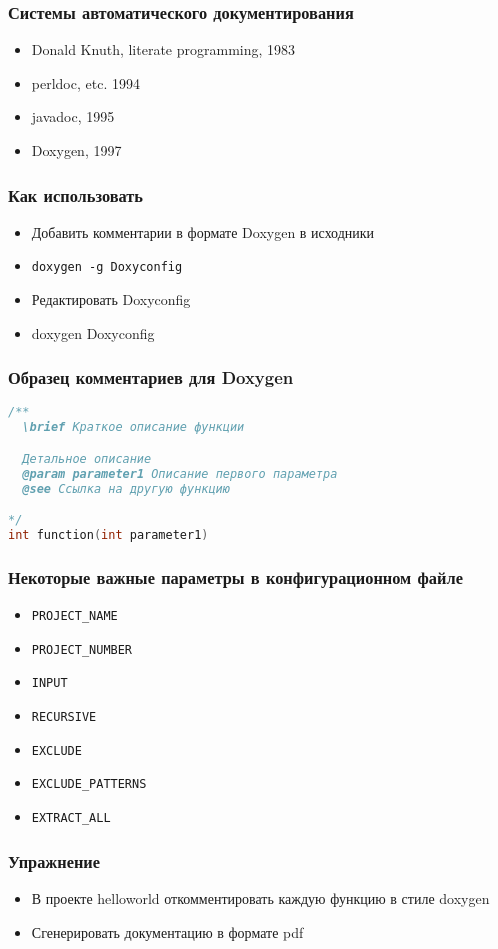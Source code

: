 \begin{frame}
 \frametitle{Системы автоматического документирования}
 \begin{itemize}
  \item Donald Knuth, literate programming, 1983
  \item perldoc, etc. 1994
  \item javadoc, 1995
  \item Doxygen, 1997
 \end{itemize}
\end{frame}

\begin{frame}
 \frametitle{Как использовать}
 \begin{itemize}
  \item Добавить комментарии в формате Doxygen в исходники
  \item \texttt{doxygen -g Doxyconfig}
  \item Редактировать Doxyconfig
  \item doxygen Doxyconfig
 \end{itemize}
\end{frame}

\begin{frame}[fragile]
 \frametitle{Образец комментариев для Doxygen}
\begin{lstlisting}[language=C]
/**
  \brief Краткое описание функции

  Детальное описание
  @param parameter1 Описание первого параметра
  @see Ссылка на другую функцию

*/
int function(int parameter1) 
\end{lstlisting}
\end{frame}

\begin{frame}[fragile]
 \frametitle{Некоторые важные параметры в конфигурационном файле}
 \begin{itemize}
  \item \verb+PROJECT_NAME+
  \item \verb+PROJECT_NUMBER+
  \item \verb+INPUT+  
  \item \verb+RECURSIVE+
  \item \verb+EXCLUDE+
  \item \verb+EXCLUDE_PATTERNS+
  \item \verb+EXTRACT_ALL+
 \end{itemize}
\end{frame}

\begin{frame}
 \frametitle{Упражнение}
  \begin{itemize}
    \item В проекте helloworld откомментировать каждую функцию в стиле doxygen
    \item Сгенерировать документацию в формате pdf
  \end{itemize}
\end{frame} 
